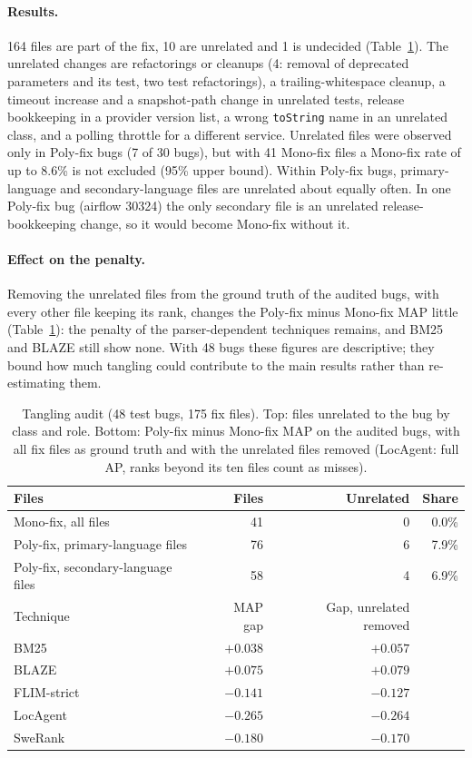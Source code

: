 \documentclass[10pt,a4paper]{article}
\begin{document}
\paragraph{Results.} 164 files are part of the fix, 10 are unrelated and 1 is
undecided (Table~\ref{tab:tangling}). The unrelated changes are refactorings or
cleanups (4: removal of deprecated parameters and its test, two test
refactorings), a trailing-whitespace cleanup, a timeout increase and a
snapshot-path change in unrelated tests, release bookkeeping in a provider
version list, a wrong \texttt{toString} name in an unrelated class, and a
polling throttle for a different service. Unrelated files were observed only in
Poly-fix bugs (7 of 30 bugs), but with 41 Mono-fix files a Mono-fix rate of up
to 8.6\% is not excluded (95\% upper bound). Within Poly-fix bugs,
primary-language and secondary-language files are unrelated about equally
often. In one Poly-fix bug (airflow 30324) the only secondary file is an
unrelated release-bookkeeping change, so it would become Mono-fix without it.

\paragraph{Effect on the penalty.} Removing the unrelated files from the ground
truth of the audited bugs, with every other file keeping its rank, changes the
Poly-fix minus Mono-fix MAP little (Table~\ref{tab:tangling}): the penalty of
the parser-dependent techniques remains, and BM25 and BLAZE still show none.
With 48 bugs these figures are descriptive; they bound how much tangling could
contribute to the main results rather than re-estimating them.

\begin{table}[t]
\caption{Tangling audit (48 test bugs, 175 fix files). Top: files unrelated to
the bug by class and role. Bottom: Poly-fix minus Mono-fix MAP on the audited
bugs, with all fix files as ground truth and with the unrelated files removed
(LocAgent: full AP, ranks beyond its ten files count as misses).}
\label{tab:tangling}
\small
\begin{tabular}{lrrr}
\toprule
Files & Files & Unrelated & Share \\
\midrule
Mono-fix, all files & 41 & 0 & 0.0\% \\
Poly-fix, primary-language files & 76 & 6 & 7.9\% \\
Poly-fix, secondary-language files & 58 & 4 & 6.9\% \\
\midrule
Technique & MAP gap & Gap, unrelated removed & \\
\midrule
BM25 & $+0.038$ & $+0.057$ & \\
BLAZE & $+0.075$ & $+0.079$ & \\
FLIM-strict & $-0.141$ & $-0.127$ & \\
LocAgent & $-0.265$ & $-0.264$ & \\
SweRank & $-0.180$ & $-0.170$ & \\
\bottomrule
\end{tabular}
\end{table}
\end{document}
